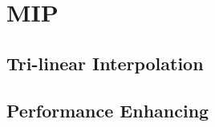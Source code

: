 \section{MIP}\label{sec:mip}

\subsection{Tri-linear Interpolation}\label{sec:tri_linear}

\subsection{Performance Enhancing}\label{sec:perf_enh}